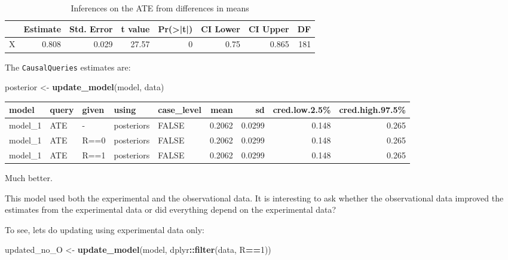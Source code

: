 \documentclass[
  12pt,
]{book}
\newenvironment{Shaded}{\begin{snugshade}}{\end{snugshade}}
\newcommand{\DecValTok}[1]{\textcolor[rgb]{0.00,0.00,0.81}{#1}}
\newcommand{\FunctionTok}[1]{\textcolor[rgb]{0.13,0.29,0.53}{\textbf{#1}}}
\newcommand{\NormalTok}[1]{#1}
\newcommand{\OtherTok}[1]{\textcolor[rgb]{0.56,0.35,0.01}{#1}}
\newcommand{\SpecialCharTok}[1]{\textcolor[rgb]{0.81,0.36,0.00}{\textbf{#1}}}
\begin{document}
\begin{table}

\caption{\label{tab:unnamed-chunk-118}Inferences on the ATE from differences in means}
\centering
\begin{tabular}[t]{l|r|r|r|r|r|r|r}
\hline
  & Estimate & Std. Error & t value & Pr(>|t|) & CI Lower & CI Upper & DF\\
\hline
X & 0.808 & 0.029 & 27.57 & 0 & 0.75 & 0.865 & 181\\
\hline
\end{tabular}
\end{table}

The \texttt{CausalQueries} estimates are:

\begin{Shaded}
\begin{Highlighting}[]
\NormalTok{posterior }\OtherTok{\textless{}{-}} \FunctionTok{update\_model}\NormalTok{(model, data)}
\end{Highlighting}
\end{Shaded}

\begin{tabular}{l|l|l|l|l|r|r|r|r}
\hline
model & query & given & using & case\_level & mean & sd & cred.low.2.5\% & cred.high.97.5\%\\
\hline
model\_1 & ATE & - & posteriors & FALSE & 0.2062 & 0.0299 & 0.148 & 0.265\\
\hline
model\_1 & ATE & R==0 & posteriors & FALSE & 0.2062 & 0.0299 & 0.148 & 0.265\\
\hline
model\_1 & ATE & R==1 & posteriors & FALSE & 0.2062 & 0.0299 & 0.148 & 0.265\\
\hline
\end{tabular}

Much better.

This model used both the experimental and the observational data. It is interesting to ask whether the observational data improved the estimates from the experimental data or did everything depend on the experimental data?

To see, lets do updating using experimental data only:

\begin{Shaded}
\begin{Highlighting}[]
\NormalTok{updated\_no\_O }\OtherTok{\textless{}{-}} \FunctionTok{update\_model}\NormalTok{(model, dplyr}\SpecialCharTok{::}\FunctionTok{filter}\NormalTok{(data, R}\SpecialCharTok{==}\DecValTok{1}\NormalTok{))}
\end{Highlighting}
\end{Shaded}
\end{document}
